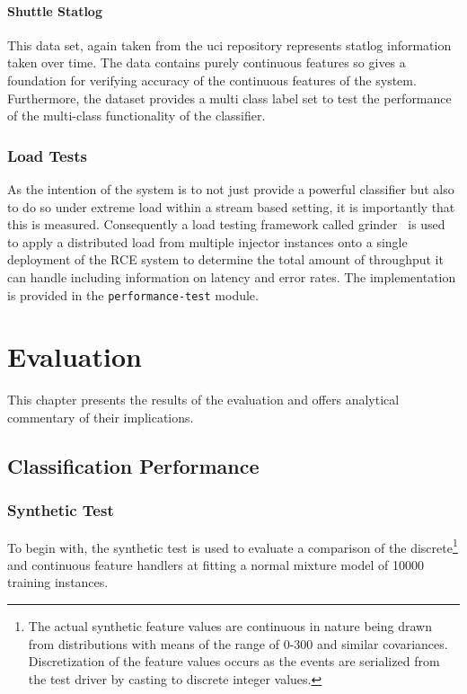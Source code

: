 \documentclass[a4paper,11pt]{scrreprt}
\begin{document}
\subsubsection{Shuttle Statlog}
This data set, again taken from the \acrshort{uci} repository represents statlog information taken over time. The data contains purely continuous features so gives a foundation for verifying accuracy of the continuous features of the system. Furthermore, the dataset provides a multi class label set to test the performance of the multi-class functionality of the classifier. 

\subsection{Load Tests}
As the intention of the system is to not just provide a powerful classifier but also to do so under extreme load within a stream based setting, it is importantly that this is measured. Consequently a load testing framework called grinder~\cite{grinder} is used to apply a distributed load from multiple injector instances onto a single deployment of the RCE system to determine the total amount of throughput it can handle including information on latency and error rates. The implementation is provided in the \verb|performance-test| module.

\chapter{Evaluation}
This chapter presents the results of the evaluation and offers analytical commentary of their implications.
\section{Classification Performance}
\subsection{Synthetic Test}
To begin with, the synthetic test is used to evaluate a comparison of the discrete\footnote{The actual synthetic feature values are continuous in nature being drawn from distributions with means of the range of 0-300 and similar covariances. Discretization of the feature values occurs as the events are serialized from the test driver by casting to discrete integer values.} and continuous feature handlers at fitting a normal mixture model of 10000 training instances.
\end{document}
